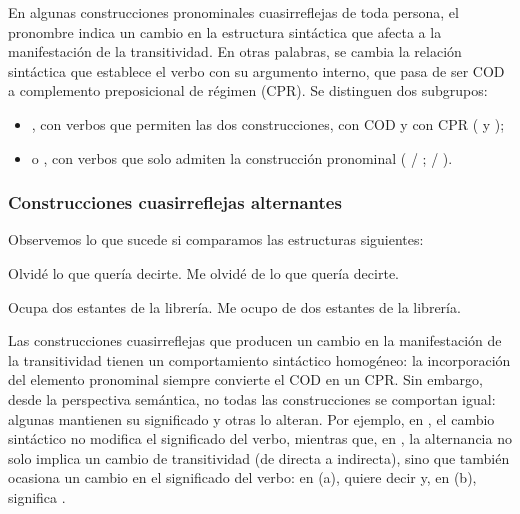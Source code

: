 En algunas construcciones pronominales cuasirreflejas de toda persona, el
pronombre indica un cambio en la estructura sintáctica que afecta a la
manifestación de la transitividad. En otras palabras, se cambia la relación
sintáctica que establece el verbo con su argumento interno, que pasa de ser COD a
complemento preposicional de régimen (CPR). Se distinguen dos subgrupos:

\begin{itemize}
  \item {}, con verbos que
        permiten las dos construcciones, con COD y con CPR ( y );
  \item {} o ,
        con verbos que solo admiten la construcción pronominal (
        / ;  /
        ).
\end{itemize}

\subsubsection{Construcciones cuasirreflejas alternantes}\label{sec:10-alternantes}

Observemos lo que sucede si comparamos las estructuras siguientes:

\begin{exe}
  \ex\label{ex:10-olvide}
    \begin{xlist}
      \ex Olvidé lo que quería decirte.
      \ex Me olvidé de lo que quería decirte.
    \end{xlist}
  \ex\label{ex:10-ocupa}
    \begin{xlist}
      \ex Ocupa dos estantes de la librería.
      \ex Me ocupo de dos estantes de la librería.
    \end{xlist}
\end{exe}

Las construcciones cuasirreflejas que producen un cambio en la manifestación de
la transitividad tienen un comportamiento sintáctico homogéneo: la incorporación
del elemento pronominal siempre convierte el COD en un CPR. Sin embargo, desde la
perspectiva semántica, no todas las construcciones se comportan igual: algunas
mantienen su significado y otras lo alteran. Por ejemplo, en
, el cambio sintáctico no modifica el significado del verbo,
mientras que, en , la alternancia no solo implica un cambio de
transitividad (de directa a indirecta), sino que también ocasiona un cambio en el
significado del verbo: en (a),  quiere decir  y, en (b),  significa .


